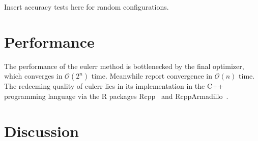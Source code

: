\documentclass[a4paper,nofonts,nobib,titlepage,justified,marginals=raggedouter,nohyper]{tufte-handout}\usepackage[]{graphicx}\usepackage[]{color}
\newcommand{\pkg}[1]{{\fontseries{b}\selectfont #1}}
\begin{document}
Insert accuracy tests here for random configurations.

\section{Performance}
\label{sec:performance}

The performance of the \pkg{eulerr} method is bottlenecked by the final optimizer,
which converges in $\mathcal{O}(2^n)$ time. Meanwhile \citet{wilkinson_2012} report
convergence in $\mathcal{O}(n)$ time. The redeeming quality of \pkg{eulerr} lies
in its implementation in the C++ programming language via the \pkg{R} packages
\pkg{Rcpp}~\citep{eddelbuettel_2011} and \pkg{RcppArmadillo}~\citep{eddelbuettel_2014}.

\section{Discussion}
\label{sec:discussion}



\end{document}

